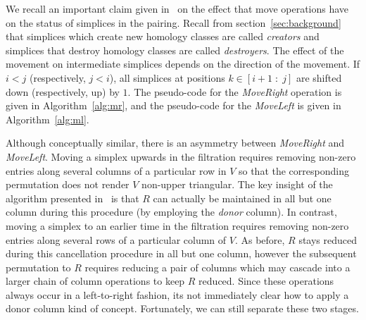 \documentclass{article} %
\newtheorem{proposition}{Proposition}
\begin{document}
\noindent
We recall an important claim given in~\cite{busaryev2010tracking} on the effect that move operations have on the status of simplices in the pairing. Recall from section~\ref{sec:background} that simplices which create new homology classes are called \emph{creators} and simplices that destroy homology classes are called \emph{destroyers}.
\noindent The effect of the movement on intermediate simplices depends on the direction of the movement. If $i < j$ (respectively, $j < i$), all simplices at positions $k \in [i+1\;:\;j] $ are shifted down (respectively, up) by $1$. 
The pseudo-code for the \emph{MoveRight} operation is given in Algorithm~\ref{alg:mr}, and the pseudo-code for the \emph{MoveLeft} is given in Algorithm~\ref{alg:ml}. 



Although conceptually similar, there is an asymmetry between \emph{MoveRight} and \emph{MoveLeft}. Moving a simplex upwards in the filtration requires removing non-zero entries along several columns of a particular row in $V$ so that the corresponding permutation does not render $V$ non-upper triangular. The key insight of the algorithm presented in~\cite{busaryev2010tracking} is that $R$ can actually be maintained in all but one column during this procedure (by employing the \emph{donor} column). In contrast, moving a simplex to an earlier time in the filtration requires removing non-zero entries along several rows of a particular column of $V$. As before, $R$ stays reduced during this cancellation procedure in all but one column, however the subsequent permutation to $R$ requires reducing a pair of columns which may cascade into a larger chain of column operations to keep $R$ reduced. Since these operations always occur in a left-to-right fashion, its not immediately clear how to apply a donor column kind of concept. Fortunately, we can still separate  these two stages. 
\end{document}
